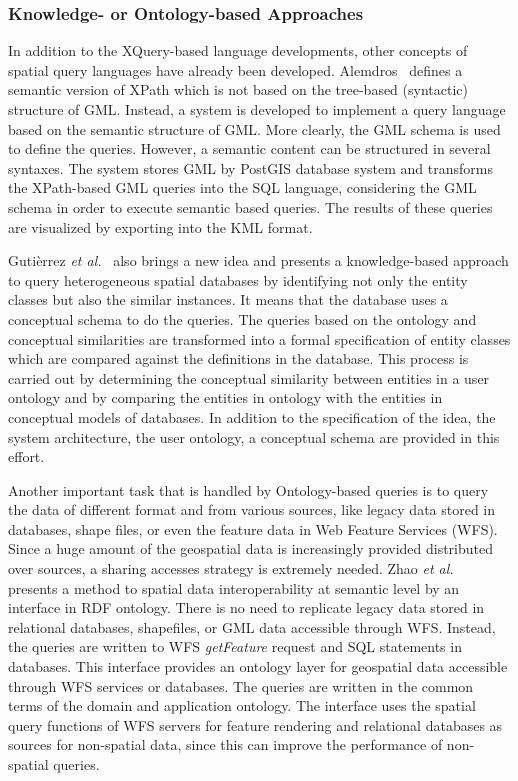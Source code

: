 \documentclass[a4paper,12pt]{article}
\begin{document}
\subsubsection{Knowledge- or Ontology-based Approaches}
\label{ontology}
In addition to the XQuery-based language developments, 
other concepts of spatial query languages have already been developed. 
Alemdros~\cite{Alemdros2011, Alemdros2013} defines a semantic version of XPath 
which is not based on the tree-based (syntactic) structure of GML. Instead, a system is developed to implement a query language based on the semantic structure of GML. More clearly, the GML schema is used to define the queries. However, a semantic content can be structured in several syntaxes. The system stores GML by PostGIS database system and transforms the XPath-based GML queries into the SQL language, considering the GML schema in order to execute semantic based queries. The results of these queries are visualized by exporting into the KML format.

Guti{\`e}rrez \emph{et al.}~\cite{Gutierrez2004} also brings a new idea and presents a knowledge-based approach 
to query heterogeneous spatial databases by identifying not only the entity classes but also the similar instances. 
It means that the database uses a conceptual schema to do the queries. 
The queries based on the ontology and conceptual similarities 
are transformed into a formal specification of entity classes 
which are compared against the definitions in the database. 
This process is carried out by determining the conceptual similarity between entities in a user ontology 
and by comparing the entities in ontology with the entities in conceptual models of databases. 
In addition to the specification of the idea, the system architecture, the user ontology, 
a conceptual schema are provided in this effort.

Another important task that is handled by Ontology-based queries is to query 
the data of different format and from various sources,
like legacy data stored in databases, shape files, 
or even the feature data in Web Feature Services (WFS).
Since a huge amount of the geospatial data is increasingly provided
distributed over sources,
a sharing accesses strategy is extremely needed.
Zhao \emph{et al.}~\cite{Zhao2008} presents a method to spatial data 
interoperability at semantic level by an interface in RDF ontology. 
There is no need to replicate legacy data stored in relational databases, shapefiles, or GML data accessible through WFS. Instead, the queries are written to WFS \textit{getFeature} request and SQL statements in databases. 
This interface provides an ontology layer for geospatial data accessible through WFS services or databases. 
The queries are written in the common terms of the domain and application ontology. 
The interface uses the spatial query functions of WFS servers for feature rendering and relational databases as sources for non-spatial data, since this can improve the performance of non-spatial queries. 
\end{document}
